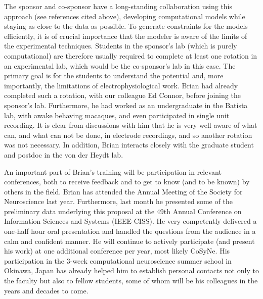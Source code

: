 \documentclass[11pt,notitlepage]{article}
\begin{document}
The sponsor and co-sponsor have a long-standing
collaboration using this approach (see references cited above),
developing computational models while staying as close to the data as
possible. To generate constraints for the models efficiently, it is of
crucial importance that the modeler is aware of the limits of the
experimental techniques. Students in the sponsor's lab (which is
purely computational) are therefore usually required to complete at
least one rotation in an experimental lab, which would be the
co-sponsor's lab in this case. The primary goal is for the students to
understand the potential and, more importantly, the limitations of
electrophysiological work. Brian had already completed such a
rotation, with our colleague Ed Connor, before joining the sponsor's
lab. Furthermore, he had worked as an undergraduate in the Batista
lab, with awake behaving macaques, and even participated in single
unit recording. It is clear from discussions with him that he is very
well aware of what can, and what can not be done, in electrode
recordings, and so another rotation was not necessary.  In addition,
Brian interacts closely with the graduate student and postdoc in the
von der Heydt lab.

An important part of Brian's training will be participation in
relevant conferences, both to receive feedback and to get to know (and
to be known) by others in the field. 
Brian has attended the Annual Meeting
of the Society for Neuroscience last year. Furthermore, last month he
presented some of the 
preliminary data underlying this proposal at the 49th Annual
Conference on Information Sciences and Systems (IEEE-CISS). He
very competently delivered a one-half hour oral presentation and
handled the questions from the audience in a calm and confident
manner. 
%
 He will continue to 
actively participate (and present his work) at one additional
conference per year, most likely CoSyNe. His participation in the 3-week computational neuroscience summer school in Okinawa, Japan has already helped him to establish personal contacts not only to the faculty but also to fellow students, some of whom will be his colleagues in the years and decades to come.
\end{document}
